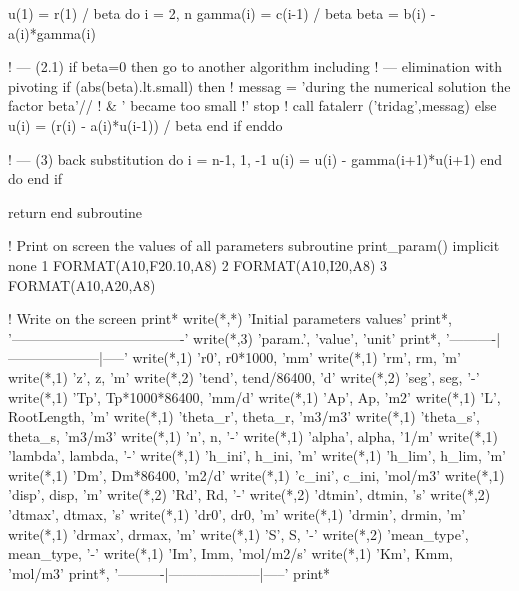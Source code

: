         u(1) = r(1) / beta
        do i = 2, n
          gamma(i) = c(i-1) / beta
          beta = b(i) - a(i)*gamma(i)

! ---     (2.1) if beta=0 then go to another algorithm including
! ---     elimination with pivoting
          if (abs(beta).lt.small) then
!            messag = 'during the numerical solution the factor beta'//
!     &      ' became too small !'
            stop
!            call fatalerr ('tridag',messag)
          else
            u(i) = (r(i) - a(i)*u(i-1)) / beta
            end if
        enddo

! ---   (3) back substitution
        do i = n-1, 1, -1
          u(i) = u(i) - gamma(i+1)*u(i+1)
        end do
      end if

      return
end subroutine

! Print on screen the values of all parameters
subroutine print_param()
implicit none
1 FORMAT(A10,F20.10,A8)
2 FORMAT(A10,I20,A8)
3 FORMAT(A10,A20,A8)
  
  ! Write on the screen
  print*
  write(*,*) 'Initial parameters values'
  print*, '-------------------------------------'
  write(*,3) 'param.', 'value', 'unit'
  print*, '----------|--------------------|-----'
  write(*,1) 'r0', r0*1000, 'mm'
  write(*,1) 'rm', rm, 'm'
  write(*,1) 'z', z, 'm'
  write(*,2) 'tend', tend/86400, 'd'
  write(*,2) 'seg', seg, '-'
  write(*,1) 'Tp', Tp*1000*86400, 'mm/d'
  write(*,1) 'Ap', Ap, 'm2'
  write(*,1) 'L', RootLength, 'm'
  write(*,1) 'theta_r', theta_r, 'm3/m3'
  write(*,1) 'theta_s', theta_s, 'm3/m3'
  write(*,1) 'n', n, '-'
  write(*,1) 'alpha', alpha, '1/m'
  write(*,1) 'lambda', lambda, '-'
  write(*,1) 'h_ini', h_ini, 'm'
  write(*,1) 'h_lim', h_lim, 'm'
  write(*,1) 'Dm', Dm*86400, 'm2/d'
  write(*,1) 'c_ini', c_ini, 'mol/m3'
  write(*,1) 'disp', disp, 'm'
  write(*,2) 'Rd', Rd, '-'
  write(*,2) 'dtmin', dtmin, 's'
  write(*,2) 'dtmax', dtmax, 's'
  write(*,1) 'dr0', dr0, 'm'
  write(*,1) 'drmin', drmin, 'm'
  write(*,1) 'drmax', drmax, 'm'
  write(*,1) 'S', S, '-'
  write(*,2) 'mean_type', mean_type, '-'
  write(*,1) 'Im', Imm, 'mol/m2/s'
  write(*,1) 'Km', Kmm, 'mol/m3'
  print*, '----------|--------------------|-----'
  print*

